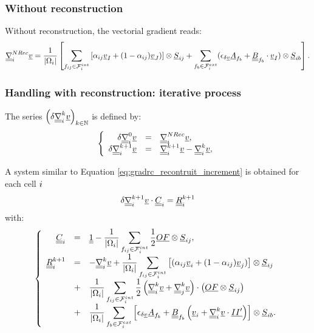 \subsubsection{Without reconstruction}
Without reconstruction, the vectorial gradient reads:
\begin{equation}\label{eq:spadis:gradrv_nonrecontruit}
\underline{\underline{\nabla}}_i^{NRec} \underline{v}= \dfrac{1}{\left| \Omega_{i} \right|} \left[
  \sum\limits_{{f_{ij}} \in \mathcal{F}^{int}_{i}} \left[\alpha_{{ij}} \underline{v}_I + (1 - \alpha_{{ij}}) \underline{v}_J) \right] \otimes \underline{S}_{{ij}}
+\sum\limits_{{f_{b}} \in \mathcal{F}^{ext}_{i}}(\epsilon_{\delta \underline{v}} \underline{A}_{{f_{b}}} + \underline{\underline{B}}_{{f_{b}}} \cdot \underline{v}_I
)\otimes  \underline{S}_{{ib}} \right].
\end{equation}

\subsubsection{Handling with reconstruction: iterative process}

The series $\left( \delta \underline{\underline{\nabla}}_i^k \underline{v} \right)_{k \in \mathbb{N}}$ is defined by:
%
\begin{equation}
\left\{\begin{array}{r c l}
\delta \underline{\underline{\nabla}}_i^0 \underline{v} &=& \underline{\underline{\nabla}}_i^{NRec} \underline{v}, \\
\delta \underline{\underline{\nabla}}_i^{k+1} \underline{v} &= &\underline{\underline{\nabla}}_i^{k+1} \underline{v} - \underline{\underline{\nabla}}_i^k \underline{v} ,
\end{array}\right.
\end{equation}

A system similar to Equation \eqref{eq:gradrc_recontruit_increment} is obtained
for each cell $i$
%
\begin{equation}\label{eq:eq_systeme_matriciel_gradrv}
\delta \underline{\underline{\nabla}}_i^{k+1} \underline{v}
\cdot
\underline{\underline{C}}_{i}
=
\underline{\underline{R}}^{k+1}_{i}
\end{equation}
%
with:
%
\begin{equation}\label{eq:eq_second_membre_gradrv}
\left\{\begin{array}{rcl}
\underline{\underline{C}}_i  &=&
\displaystyle
 \underline{\underline{1}} -
\dfrac{1}{\left| \Omega_{i} \right|}\sum\limits_{ {f_{ij}} \in \mathcal{F}^{int}_{i}} \frac{1}{2}  \underline{O F} \otimes \underline{S}_{{ij}}
,\\
\underline{\underline{R}}^{k+1}_{i} &=&
\displaystyle
 -  \underline{\underline{\nabla}}_{i}^{k} \underline{v}
 + \dfrac{1}{\left| \Omega_{i} \right|}
\sum\limits_{{f_{ij}} \in \mathcal{F}^{int}_{i}}\left[
(\alpha_{{ij}} \underline{v}_i + (1 - \alpha_{{ij}}) \underline{v}_j)\right] \otimes \underline{S}_{{ij}} \\
&+& \displaystyle
 \dfrac{1}{\left| \Omega_{i} \right|}
\sum\limits_{{f_{ij}} \in \mathcal{F}^{int}_{i}} \frac{1}{2}
\left(\underline{\underline{\nabla}}_i^k \underline{v} + \underline{\underline{\nabla}}_j^k \underline{v} \right) \cdot \left( \underline{O F} \otimes \underline{S}_{{ij}} \right) \\
&+& \displaystyle
 \dfrac{1}{\left| \Omega_{i} \right|}
\sum\limits_{{f_{b}} \in \mathcal{F}^{ext}_{i}}\left[ \epsilon_{\delta \underline{v}} \underline{A}_{{f_{b}}}
+ \underline{\underline{B}}_{{f_{b}}} \left( \underline{v}_i + \underline{\underline{\nabla}}_i^k \underline{v} \cdot \underline{I {I^\prime}} \right)  \right] \otimes \underline{S}_{{ib}} .
\end{array}\right.
\end{equation}

